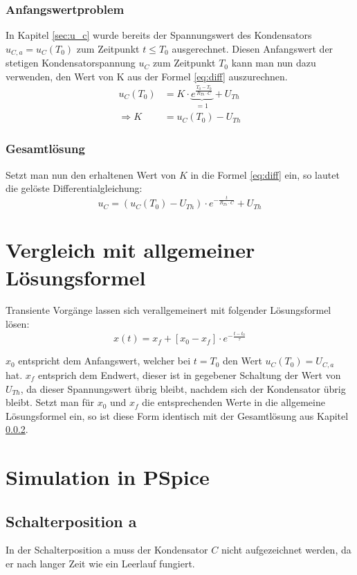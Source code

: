 \documentclass[11pt]{scrartcl}
\begin{document}
\subsubsection{Anfangswertproblem}
In Kapitel \ref{sec:u_c} wurde bereits der Spannungswert des Kondensators $u_{C,a} = u_C(T_0)$ zum Zeitpunkt $t \leq T_0$ ausgerechnet.
Diesen Anfangswert der stetigen Kondensatorspannung $u_C$ zum Zeitpunkt $T_0$ kann man nun dazu verwenden,
den Wert von K aus der Formel \ref{eq:diff} auszurechnen.
\begin{align*}
  u_C (T_0) &= K \cdot \underbrace{e^{\frac{T_0 - T_0}{R_{Th}\cdot C}}}_{=1} + U_{Th} \\
  \Longrightarrow K &= u_C (T_0) - U_{Th}
\end{align*}

\subsubsection{Gesamtlösung}\label{sec:sol}
Setzt man nun den erhaltenen Wert von $K$ in die Formel \ref{eq:diff} ein, so lautet die gelöste Differentialgleichung:
\begin{equation*}
  u_C = (u_C(T_0) - U_{Th}) \cdot e^{-\frac{t}{R_{Th}\cdot C}} + U_{Th}
\end{equation*}

\section{Vergleich mit allgemeiner Lösungsformel}
Transiente Vorgänge lassen sich verallgemeinert mit folgender Lösungsformel lösen:
\begin{equation*}
  x(t) = x_f + \left[ x_0 - x_f \right] \cdot e^{-\frac{t-t_0}{\tau}}
\end{equation*}

$x_0$ entspricht dem Anfangswert, welcher bei $t=T_0$ den Wert $u_C(T_0) = U_{C,a}$ hat.
$x_f$ entsprich dem Endwert, dieser ist in gegebener Schaltung der Wert von $U_{Th}$, da dieser Spannungswert übrig bleibt,
nachdem sich der Kondensator übrig bleibt.
Setzt man für $x_0$ und $x_f$ die entsprechenden Werte in die allgemeine Lösungsformel ein,
so ist diese Form identisch mit der Gesamtlösung aus Kapitel \ref{sec:sol}.


\newpage
\section{Simulation in PSpice}
\subsection{Schalterposition a}
In der Schalterposition a muss der Kondensator $C$ nicht aufgezeichnet werden, da er nach langer Zeit wie ein Leerlauf fungiert.
\end{document}
